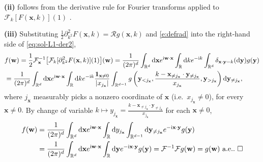 \documentclass[11pt,A4,twoside]{article}
\newcommand\ind{\mathbf{1}}
\numberwithin{equation}{section}
\renewcommand{\vec}{\mathbf}
\newcommand{\F}{\mathcal{F}}
\renewcommand*\d{\mathop{}\!\mathrm{d}}
\newcommand{\x}{\mathbf{x}}
\newcommand{\y}{\mathbf{y}}
\newcommand{\w}{\mathbf{w}}
\newcommand{\R}{\mathbbm{R}}
\newcommand{\Ra}{\mathcal{R}}
\newcommand{\intRd}{\int_{\R^d}}
\def\bel{\begin{eqnarray*}\begin{aligned}}
\def\eel{\end{aligned}\end{eqnarray*}}
\theoremstyle{definition}
\theoremstyle{remark}
\def\R{\mathbb{R}}
\def\finproof {$\Box$ \vskip 5 pt }\def\finproof{\rule{4pt}{6pt}}\def\finproof{\ensuremath{\square}}
\def\thermi{{\rm i}}%
\begin{document}
\noindent
\textbf{(ii)} follows from the derivative rule for Fourier transforms applied to $\F_k[ F(\x,k)](1) $ \cite[Theorem 1.8 page 12]{iosevich2014decay}.

\noindent
\textbf{(iii)} 
Substituting $\frac12\partial^2_{k^2} F(\x,k) = \Ra g(\vec x,k)$ and \eqref{e:defrad} into the right-hand side of \eqref{eq:sol-L1-der2},
\bel
&f(\w )=\frac{1}{2}\F^{-1}_\x\big[\F_k[ \partial^2_{k^2} F(\x,k)](1)\big] (\w) = \frac1{(2\pi)^d}\intRd \d\x e^{\thermi \w\cdot\x}\int_\R \d k e^{-\thermi k} \intRd \delta_{\x\cdot\y = k}(\d\y) g(\vec y)\\
&=\frac1{(2\pi)^d}\intRd \d\x e^{\thermi \w\cdot\x}\int_\R \d k e^{-\thermi k} \frac{\ind_{\x\ne 0}}{|x_{j_\x}|} \int_{\R^{d-1}}  g\left(\y_{<j_\x}, \frac{k- \x_{\ne j_\x} \cdot \y_{\ne j_\x}}{x_{j_\x}}, \y_{>j_\x}\right)  \d \y_{\ne {j_\x}},
\eel
where $j_\x$ measurably picks a nonzero coordinate of $\x$ (i.e.\ $x_{j_\x}\ne 0$), for every $\x\ne 0.$
By change of variable $k \mapsto y_{j_\x} = \frac{k- \x_{\ne {j_\x}} \cdot \y_{\ne {j_\x}}}{x_{j_\x}}$ for each $\x\ne 0$,
\begin{align*}
 f(\w )&= \frac1{(2\pi)^d}\intRd \d\x e^{\thermi \w\cdot\x}\int_\R \d y_{j_\x}  \int_{\R^{d-1}}\d \y_{\ne {j_\x} } e^{-\thermi \x\cdot \y} g(\y)\\
 &=\frac1{(2\pi)^d}\intRd \d\x e^{\thermi \w\cdot\x}\int_\R \d \y e^{-\thermi \x\cdot \y} g(\y) = \F^{-1}\F g(\w) = g (\w)  \text{ a.e.}.\ \finproof  
 \end{align*}



\end{document}
